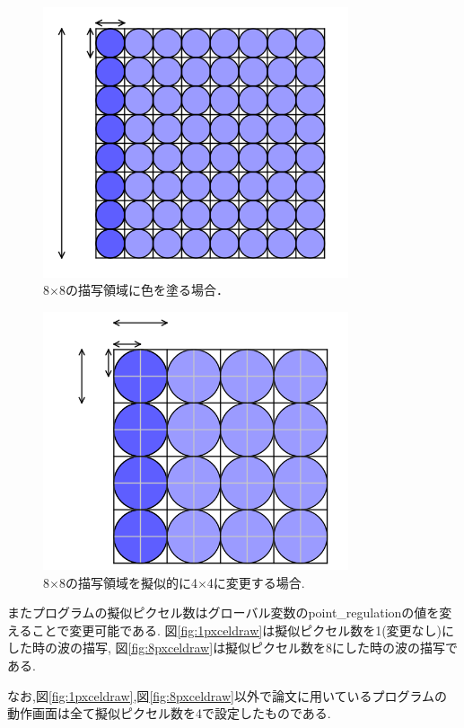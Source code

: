 \begin{figure}[htbp]
 \begin{center}
  \includegraphics[width=90mm]{../implement/1pxcel.png}
 \end{center}
 \caption{8$×$8の描写領域に色を塗る場合．}
 \label{fig:1pxcel}
\end{figure}


\begin{figure}[htbp]
 \begin{center}
  \includegraphics[width=90mm]{../implement/2pxcel.png}
 \end{center}
 \caption{8$×$8の描写領域を擬似的に4$×$4に変更する場合.}
 \label{fig:2pxcel}
\end{figure}


\newpage
またプログラムの擬似ピクセル数はグローバル変数のpoint\_regulationの値を変えることで変更可能である.
図\ref{fig:1pxceldraw}は擬似ピクセル数を1(変更なし)にした時の波の描写,
 図\ref{fig:8pxceldraw}は擬似ピクセル数を8にした時の波の描写である.
 
 なお,図\ref{fig:1pxceldraw},図\ref{fig:8pxceldraw}以外で論文に用いているプログラムの動作画面は全て擬似ピクセル数を4で設定したものである.






